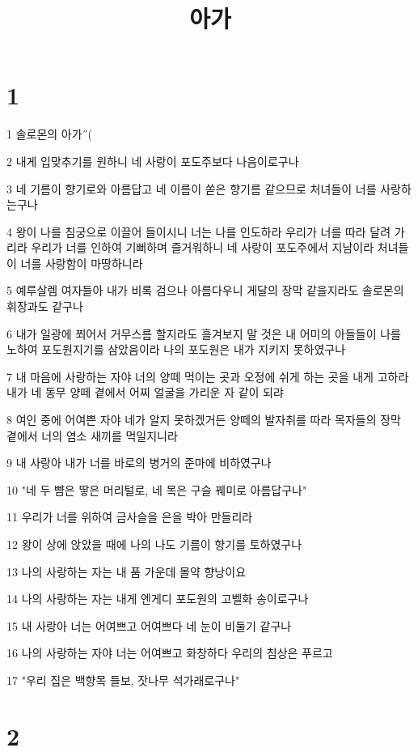 

\title{아가}


\chapter{1}

\par 1 솔로몬의 아가˝(
\par 2 내게 입맞추기를 원하니 네 사랑이 포도주보다 나음이로구나
\par 3 네 기름이 향기로와 아름답고 네 이름이 쏟은 향기름 같으므로 처녀들이 너를 사랑하는구나
\par 4 왕이 나를 침궁으로 이끌어 들이시니 너는 나를 인도하라 우리가 너를 따라 달려 가리라 우리가 너를 인하여 기뻐하며 즐거워하니 네 사랑이 포도주에서 지남이라 처녀들이 너를 사랑함이 마땅하니라
\par 5 예루살렘 여자들아 내가 비록 검으나 아름다우니 게달의 장막 같을지라도 솔로몬의 휘장과도 같구나
\par 6 내가 일광에 쬐어서 거무스름 할지라도 흘겨보지 말 것은 내 어미의 아들들이 나를 노하여 포도원지기를 삼았음이라 나의 포도원은 내가 지키지 못하였구나
\par 7 내 마음에 사랑하는 자야 너의 양떼 먹이는 곳과 오정에 쉬게 하는 곳을 내게 고하라 내가 네 동무 양떼 곁에서 어찌 얼굴을 가리운 자 같이 되랴
\par 8 여인 중에 어여쁜 자야 네가 알지 못하겠거든 양떼의 발자취를 따라 목자들의 장막 곁에서 너의 염소 새끼를 먹일지니라
\par 9 내 사랑아 내가 너를 바로의 병거의 준마에 비하였구나
\par 10 "네 두 뺨은 땋은 머리털로, 네 목은 구슬 꿰미로 아름답구나"
\par 11 우리가 너를 위하여 금사슬을 은을 박아 만들리라
\par 12 왕이 상에 앉았을 때에 나의 나도 기름이 향기를 토하였구나
\par 13 나의 사랑하는 자는 내 품 가운데 몰약 향낭이요
\par 14 나의 사랑하는 자는 내게 엔게디 포도원의 고벨화 송이로구나
\par 15 내 사랑아 너는 어여쁘고 어여쁘다 네 눈이 비둘기 같구나
\par 16 나의 사랑하는 자야 너는 어여쁘고 화창하다 우리의 침상은 푸르고
\par 17 "우리 집은 백향목 들보, 잣나무 석가래로구나"

\chapter{2}

